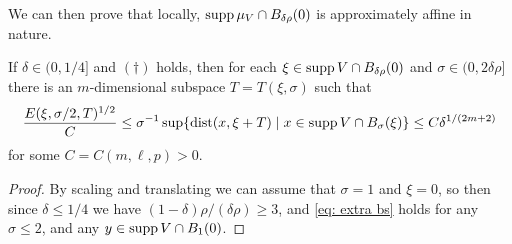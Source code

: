 We can then prove that locally, $\operatorname{supp}\mu_V \cap B_{\delta\rho}(0)$ is approximately affine in nature.

\begin{lemma}\label{lem: affine approximation lemma}
If $\delta \in (0, 1/4]$ and $(\dagger)$ holds, then for each $\xi \in \operatorname{supp} V \cap B_{\delta\rho}(0)$ and $\sigma \in (0, 2\delta\rho]$ there is an $m$-dimensional subspace $T = T(\xi, \sigma)$ such that
\begin{align}
    \frac{E(\xi, \sigma/2, T)^{1/2}}{C}
     \le \sigma^{-1} \sup\{ \operatorname{dist}(x, \xi + T) \mid x \in \operatorname{supp} V \cap B_{\sigma}(\xi) \} 
    \le C \delta^{1/(2m+2)}\nonumber
\end{align}
for some $C = C(m, \ell, p) > 0$.
\end{lemma}
\begin{proof}
By scaling and translating we can assume that $\sigma = 1$ and $\xi = 0$, so then since $\delta \le 1/4$ we have $(1-\delta)\rho/(\delta\rho) \ge 3$, and \eqref{eq: extra bs} holds for any $\sigma \le 2$, and any $y \in \operatorname{supp} V \cap B_1(0)$.


\end{proof}

